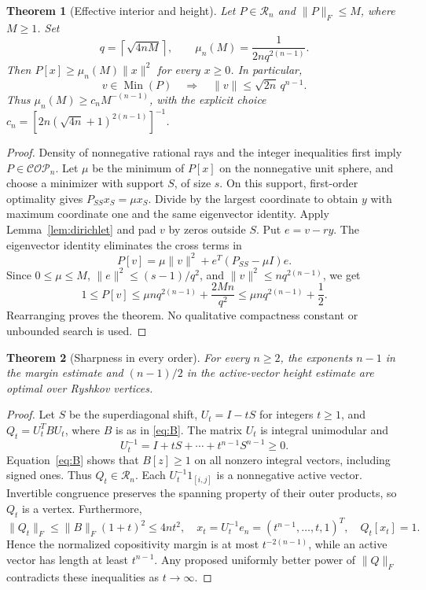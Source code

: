 \documentclass[11pt]{article}
\newtheorem{theorem}{Theorem}[section]
\theoremstyle{remark}\newtheorem{remark}[theorem]{Remark}
\newcommand{\COP}{\mathcal{COP}}
\newcommand{\Ry}{\mathcal R}
\newcommand{\Min}{\operatorname{Min}}
\newcommand{\norm}[1]{\lVert#1\rVert}
\begin{document}
\begin{theorem}[Effective interior and height]\label{thm:IR}
Let $P\in\Ry_n$ and $\norm P_F\le M$, where $M\ge1$. Set
\begin{equation}\label{eq:IR}
 q=\left\lceil\sqrt{4nM}\right\rceil,
 \qquad \mu_n(M)=\frac1{2nq^{2(n-1)}}.
\end{equation}
Then $P[x]\ge\mu_n(M)\norm x^2$ for every $x\ge0$. In particular,
\[
 v\in\Min(P)\quad\Longrightarrow\quad
 \norm v\le\sqrt{2n}\,q^{n-1}.
\]
Thus $\mu_n(M)\ge c_n M^{-(n-1)}$, with the explicit choice
$c_n=[2n(\sqrt{4n}+1)^{2(n-1)}]^{-1}$.
\end{theorem}
\begin{proof}
Density of nonnegative rational rays and the integer inequalities first imply $P\in\COP_n$. Let $\mu$ be the minimum of $P[x]$ on the nonnegative unit sphere, and choose a minimizer with support $S$, of size $s$. On this support, first-order optimality gives $P_{SS}x_S=\mu x_S$. Divide by the largest coordinate to obtain $y$ with maximum coordinate one and the same eigenvector identity. Apply Lemma~\ref{lem:dirichlet} and pad $v$ by zeros outside $S$. Put $e=v-r y$. The eigenvector identity eliminates the cross terms in
\[
 P[v]=\mu\norm v^2+e^T(P_{SS}-\mu I)e.
\]
Since $0\le\mu\le M$, $\norm e^2\le(s-1)/q^2$, and $\norm v^2\le n q^{2(n-1)}$, we get
\[
 1\le P[v]\le\mu n q^{2(n-1)}+\frac{2Mn}{q^2}
 \le\mu n q^{2(n-1)}+\frac12.
\]
Rearranging proves the theorem. No qualitative compactness constant or unbounded search is used.
\end{proof}

\begin{theorem}[Sharpness in every order]\label{thm:sharp}
For every $n\ge2$, the exponents $n-1$ in the margin estimate and $(n-1)/2$ in the active-vector height estimate are optimal over Ryshkov vertices.
\end{theorem}
\begin{proof}
Let $S$ be the superdiagonal shift, $U_t=I-tS$ for integers $t\ge1$, and
$Q_t=U_t^T B U_t$, where $B$ is as in \eqref{eq:B}. The matrix $U_t$ is integral unimodular and
\[
 U_t^{-1}=I+tS+\cdots+t^{n-1}S^{n-1}\ge0.
\]
Equation~\eqref{eq:B} shows that $B[z]\ge1$ on all nonzero integral vectors, including signed ones. Thus $Q_t\in\Ry_n$. Each $U_t^{-1}1_{[i,j]}$ is a nonnegative active vector. Invertible congruence preserves the spanning property of their outer products, so $Q_t$ is a vertex. Furthermore,
\[
 \norm{Q_t}_F\le\norm B_F(1+t)^2\le4nt^2,
 \quad x_t=U_t^{-1}e_n=(t^{n-1},\ldots,t,1)^T,
 \quad Q_t[x_t]=1.
\]
Hence the normalized copositivity margin is at most $t^{-2(n-1)}$, while an active vector has length at least $t^{n-1}$. Any proposed uniformly better power of $\norm Q_F$ contradicts these inequalities as $t\to\infty$.
\end{proof}
\end{document}
